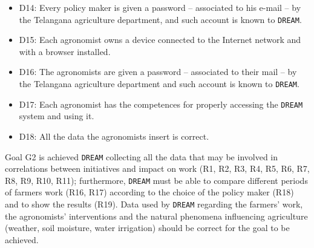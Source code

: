 \documentclass{article}
\begin{document}
\begin{itemize}
    \item D14: Every policy maker is given a password – associated to his e-mail – by the Telangana agriculture department, and such account is known to \verb|DREAM|.
  
    \item D15: Each agronomist owns a device connected to the Internet network and with a browser installed.
  
    \item D16: The agronomists are given a password – associated to their mail – by the Telangana agriculture department and such account is known to \verb|DREAM|.
  
    \item D17: Each agronomist has the competences for properly accessing the \verb|DREAM| system and using it.
   
    \item D18: All the data the agronomists insert is correct.
\end{itemize}

Goal G2 is achieved \verb|DREAM| collecting all the data that may be involved in correlations between initiatives and impact on work (R1, R2, R3, R4, R5, R6, R7, R8, R9, R10, R11); furthermore, \verb|DREAM| must be able to compare different periods of farmers work (R16, R17) according to the choice of the policy maker (R18) and to show the results (R19).
Data used by \verb|DREAM| regarding the farmers' work, the agronomists' interventions and the natural phenomena influencing agriculture (weather, soil moisture, water irrigation) should be correct for the goal to be achieved.

\vspace{5mm}
\end{document}
